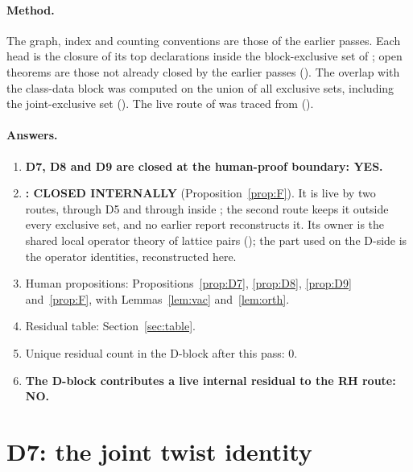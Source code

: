 \documentclass[11pt]{article}
\theoremstyle{definition}
\theoremstyle{remark}
\begin{document}
\paragraph{Method.} The graph, index and counting conventions are those of the earlier passes. Each head is the closure of its top declarations inside the block-exclusive set of ; open theorems are those not already closed by the earlier passes (). The overlap with the class-data block was computed on the union of all exclusive sets, including the joint-exclusive set (). The live route of  was traced from  ().

\paragraph{Answers.}
\begin{enumerate}[label=\Alph*.,leftmargin=*,itemsep=2pt]
\item \textbf{D7, D8 and D9 are closed at the human-proof boundary: YES.}
\item \textbf{: CLOSED INTERNALLY} (Proposition~\ref{prop:F}). It is live by two routes, through D5 and through  inside ; the second route keeps it outside every exclusive set, and no earlier report reconstructs it. Its owner is the shared local operator theory of lattice pairs (); the part used on the D-side is the operator identities, reconstructed here.
\item Human propositions: Propositions~\ref{prop:D7}, \ref{prop:D8}, \ref{prop:D9} and~\ref{prop:F}, with Lemmas~\ref{lem:vac} and~\ref{lem:orth}.
\item Residual table: Section~\ref{sec:table}.
\item Unique residual count in the D-block after this pass: $0$.
\item \textbf{The D-block contributes a live internal residual to the RH route: NO.}
\end{enumerate}

\section{D7: the joint twist identity}\label{sec:D7}
\end{document}
